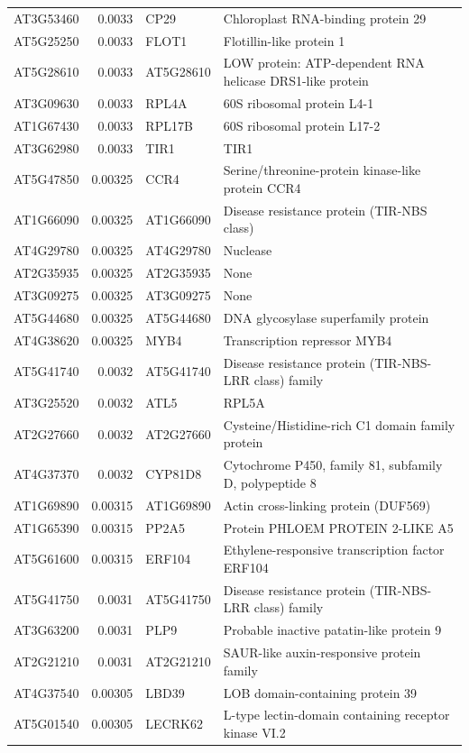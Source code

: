 \documentclass[11pt]{article}
\begin{document}
\begin{center}
\begin{tabular}{lrll}
AT3G53460 & 0.0033 & CP29 & Chloroplast RNA-binding protein 29\\
AT5G25250 & 0.0033 & FLOT1 & Flotillin-like protein 1\\
AT5G28610 & 0.0033 & AT5G28610 & LOW protein: ATP-dependent RNA helicase DRS1-like protein\\
AT3G09630 & 0.0033 & RPL4A & 60S ribosomal protein L4-1\\
AT1G67430 & 0.0033 & RPL17B & 60S ribosomal protein L17-2\\
AT3G62980 & 0.0033 & TIR1 & TIR1\\
AT5G47850 & 0.00325 & CCR4 & Serine/threonine-protein kinase-like protein CCR4\\
AT1G66090 & 0.00325 & AT1G66090 & Disease resistance protein (TIR-NBS class)\\
AT4G29780 & 0.00325 & AT4G29780 & Nuclease\\
AT2G35935 & 0.00325 & AT2G35935 & None\\
AT3G09275 & 0.00325 & AT3G09275 & None\\
AT5G44680 & 0.00325 & AT5G44680 & DNA glycosylase superfamily protein\\
AT4G38620 & 0.00325 & MYB4 & Transcription repressor MYB4\\
AT5G41740 & 0.0032 & AT5G41740 & Disease resistance protein (TIR-NBS-LRR class) family\\
AT3G25520 & 0.0032 & ATL5 & RPL5A\\
AT2G27660 & 0.0032 & AT2G27660 & Cysteine/Histidine-rich C1 domain family protein\\
AT4G37370 & 0.0032 & CYP81D8 & Cytochrome P450, family 81, subfamily D, polypeptide 8\\
AT1G69890 & 0.00315 & AT1G69890 & Actin cross-linking protein (DUF569)\\
AT1G65390 & 0.00315 & PP2A5 & Protein PHLOEM PROTEIN 2-LIKE A5\\
AT5G61600 & 0.00315 & ERF104 & Ethylene-responsive transcription factor ERF104\\
AT5G41750 & 0.0031 & AT5G41750 & Disease resistance protein (TIR-NBS-LRR class) family\\
AT3G63200 & 0.0031 & PLP9 & Probable inactive patatin-like protein 9\\
AT2G21210 & 0.0031 & AT2G21210 & SAUR-like auxin-responsive protein family\\
AT4G37540 & 0.00305 & LBD39 & LOB domain-containing protein 39\\
AT5G01540 & 0.00305 & LECRK62 & L-type lectin-domain containing receptor kinase VI.2\\

\end{tabular}
\end{center}
\end{document}
